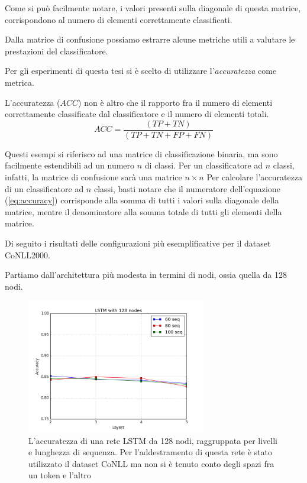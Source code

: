 Come si pu\`o facilmente notare, i valori presenti sulla diagonale di questa matrice,
corrispondono al numero di elementi correttamente classificati.

Dalla matrice di confusione possiamo estrarre alcune metriche utili a valutare le
prestazioni del classificatore.

Per gli esperimenti di questa tesi si \`e scelto di utilizzare l'\emph{accuratezza}
come metrica.

L'accuratezza ($ACC$) non \`e altro che il rapporto fra il numero di elementi correttamente
classificate dal classificatore e il numero di elementi totali.
\begin{equation} \label{eq:accuracy}
ACC = \frac{(TP + TN)}{(TP + TN + FP + FN)}
\end{equation}

Questi esempi si riferisco ad una matrice di classificazione binaria, ma sono
facilmente estendibili ad un numero $n$ di classi. Per un classificatore ad $n$
classi, infatti, la matrice di confusione sar\`a una matrice $n\times{}n$
Per calcolare l'accuratezza di un classificatore ad $n$ classi, basti notare
che il numeratore dell'equazione (\ref{eq:accuracy}) corrisponde alla somma di tutti
i valori sulla diagonale della matrice, mentre il denominatore alla somma totale
di tutti gli elementi della matrice.

Di seguito i risultati delle configurazioni pi\`u esemplificative per il dataset
CoNLL2000.

Partiamo dall'architettura pi\`u modesta in termini di nodi, ossia quella da 128
nodi.

\begin{figure}[H]
  \centering
  \begin{center}
    \includegraphics[width=0.7\textwidth]{./images/plots/english/accuracy_128n_word_min_loss.png}
  \end{center}
  \caption{L'accuratezza di una rete LSTM da 128 nodi, raggruppata per livelli e
          lunghezza di sequenza. Per l'addestramento di questa rete \`e stato
          utilizzato il dataset CoNLL ma non si \`e tenuto conto degli spazi fra
          un token e l'altro}
  \label{fig:accEng128nosp}
\end{figure}

